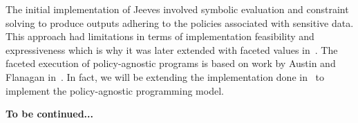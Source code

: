 The initial implementation of Jeeves involved symbolic evaluation and constraint
solving to produce outputs adhering to the policies associated with sensitive data.
This approach had limitations in terms of implementation feasibility and expressiveness
which is why it was later extended with faceted values in~\cite{FacetedJeeves}.
The faceted execution of policy-agnostic programs is based on work by Austin and
Flanagan in~\cite{Faceted}. In fact, we will be extending the implementation done
in~\cite{Faceted} to implement the policy-agnostic programming model.

\textbf{To be continued...}
